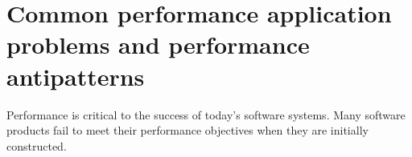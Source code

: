 \chapter{Common performance application problems and performance antipatterns}


Performance is critical to the success of today’s software systems. Many software products fail to meet their performance objectives when they are initially constructed.